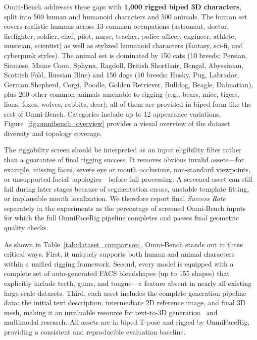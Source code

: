 \documentclass[acmtog,anonymous,review]{acmart}
\begin{document}
Omni-Bench addresses these gaps with \textbf{1,000 rigged biped 3D characters}, split into 500 human and humanoid characters and 500 animals. The human set covers realistic humans across 13 common occupations (astronaut, doctor, firefighter, soldier, chef, pilot, nurse, teacher, police officer, engineer, athlete, musician, scientist) as well as stylized humanoid characters (fantasy, sci-fi, and cyberpunk styles). The animal set is dominated by 150 cats (10 breeds: Persian, Siamese, Maine Coon, Sphynx, Ragdoll, British Shorthair, Bengal, Abyssinian, Scottish Fold, Russian Blue) and 150 dogs (10 breeds: Husky, Pug, Labrador, German Shepherd, Corgi, Poodle, Golden Retriever, Bulldog, Beagle, Dalmatian), plus 200 other common animals amenable to rigging (e.g., bears, mice, tigers, lions, foxes, wolves, rabbits, deer); all of them are provided in biped form like the rest of Omni-Bench. Categories include up to 12 appearance variations. Figure~\ref{fig:omnibench_overview} provides a visual overview of the dataset diversity and topology coverage.

The riggability screen should be interpreted as an input eligibility filter rather than a guarantee of final rigging success. It removes obvious invalid assets---for example, missing faces, severe eye or mouth occlusions, non-standard viewpoints, or unsupported facial topologies---before full processing. A screened asset can still fail during later stages because of segmentation errors, unstable template fitting, or implausible mouth localization. We therefore report final \emph{Success Rate} separately in the experiments as the percentage of screened Omni-Bench inputs for which the full OmniFaceRig pipeline completes and passes final geometric quality checks.

As shown in Table~\ref{tab:dataset_comparison}, Omni-Bench stands out in three critical ways. First, it uniquely supports both human and animal characters within a unified rigging framework. Second, every model is equipped with a complete set of auto-generated FACS blendshapes (up to 155 shapes) that explicitly include teeth, gums, and tongue---a feature absent in nearly all existing large-scale datasets. Third, each asset includes the complete generation pipeline data: the initial text description, intermediate 2D reference image, and final 3D mesh, making it an invaluable resource for text-to-3D generation~\cite{tang2024make, ren2023make} and multimodal research. All assets are in biped T-pose and rigged by OmniFaceRig, providing a consistent and reproducible evaluation baseline.
\end{document}
